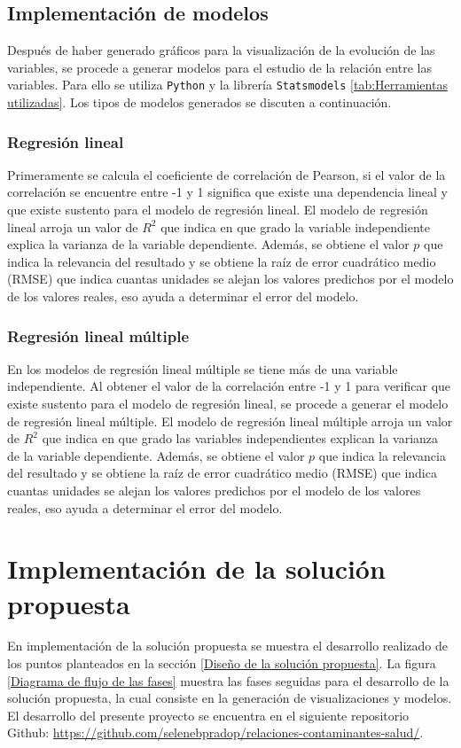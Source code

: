 \clearpage
\subsection{Implementación de modelos}
Después de haber generado gráficos para la visualización de la evolución de las variables, se procede a generar modelos para el estudio de la relación entre las variables. Para ello se utiliza \texttt{Python} y la librería \texttt{Statsmodels} \ref{tab:Herramientas utilizadas}. Los tipos de modelos generados se discuten a continuación.

\subsubsection{Regresión lineal}
Primeramente se calcula el coeficiente de correlación de Pearson, si el valor de la correlación se encuentre entre -1 y 1 significa que existe una dependencia lineal y que existe sustento para el modelo de regresión lineal. El modelo de regresión lineal arroja un valor de $R^2$ que indica en que grado la variable independiente explica la varianza de la variable dependiente. Además, se obtiene el valor $p$ que indica la relevancia del resultado y se obtiene la raíz de error cuadrático medio (RMSE) que indica cuantas unidades se alejan los valores predichos por el modelo de los valores reales, eso ayuda a determinar el error del modelo.

\subsubsection{Regresión lineal múltiple}
En los modelos de regresión lineal múltiple se tiene más de una variable independiente. Al obtener el valor de la correlación entre -1 y 1 para verificar que existe sustento para el modelo de regresión lineal, se procede a generar el modelo de regresión lineal múltiple. El modelo de regresión lineal múltiple arroja un valor de $R^2$ que indica en que grado las variables independientes explican la varianza de la variable dependiente. Además, se obtiene el valor $p$ que indica la relevancia del resultado y se obtiene la raíz de error cuadrático medio (RMSE) que indica cuantas unidades se alejan los valores predichos por el modelo de los valores reales, eso ayuda a determinar el error del modelo.

\section{Implementación de la solución propuesta}
En implementación de la solución propuesta se muestra el desarrollo realizado de los puntos planteados en la sección \ref{Diseño de la solución propuesta}. La figura \ref{Diagrama de flujo de las fases} muestra las fases seguidas para el desarrollo de la solución propuesta, la cual consiste en la generación de visualizaciones y modelos. El desarrollo del presente proyecto se encuentra en el siguiente repositorio Github: \url{https://github.com/selenebpradop/relaciones-contaminantes-salud/}.

